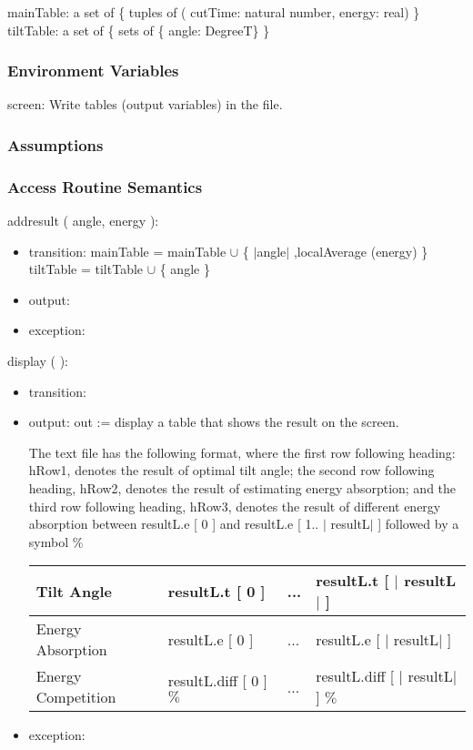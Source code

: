 \documentclass[12pt, titlepage]{article}
\begin{document}
mainTable: a set of \{ tuples of ( 
cutTime: natural number, energy: real) \}\\
tiltTable: a set of \{ sets of \{ angle: DegreeT\} \}\\


\subsubsection{Environment Variables}
screen: Write tables  (output variables) in the file. 

\subsubsection{Assumptions}


\subsubsection{ Access Routine Semantics}

\noindent  addresult ( angle, energy ):
\begin{itemize}
\item transition: mainTable = mainTable $\cup$ \{ $|$angle$|$ ,localAverage (energy)  \}\\
tiltTable = tiltTable $\cup$ \{ angle \}
\item output:
\item exception: 
\end{itemize}


\noindent  display ( ):
\begin{itemize}
\item transition:
\item output: out := display a table that shows the result on the screen.

The text file has the following format, where the first row following heading: hRow1, denotes the result of optimal tilt angle; the second row following heading, hRow2, denotes the result of estimating energy absorption; and the third row following heading, hRow3, denotes the result of different energy absorption between resultL.e [ 0 ] and resultL.e [ 1.. $|$ resultL$|$ ] followed by a symbol $\%$


\begin{center}
\begin{tabular}{p{4.5cm}|p{4cm}|p{1cm}|p{5cm}}

\hline 
Tilt Angle & resultL.t [ 0 ] & ...  & resultL.t [ $|$ resultL$|$ ] \\
\hline 
Energy Absorption & resultL.e [ 0 ] & ...  & resultL.e [ $|$ resultL$|$ ] \\
\hline 
Energy Competition & resultL.diff [ 0 ] $\%$    & ...     & resultL.diff [ $|$ resultL$|$ ] $\%$    \\
\hline
\end{tabular}
\end{center}

\item exception: 
\end{itemize}
\end{document}

